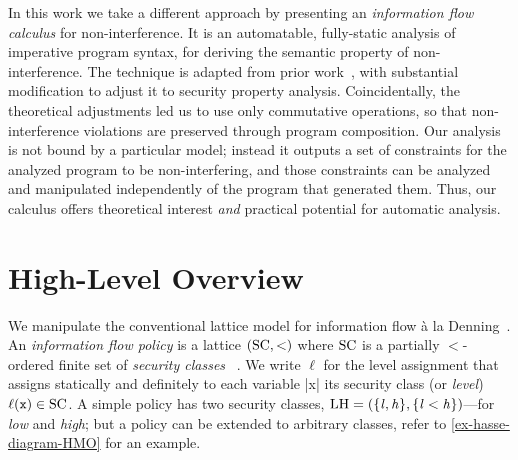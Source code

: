 In this work we take a different approach by presenting an \emph{information flow calculus} for non-interference.
It is an automatable, fully-static analysis of imperative program syntax, for deriving the semantic property of non-interference.
The technique is adapted from prior work~\cite{Aubert2023a}, with substantial modification to adjust it to security property analysis.
Coincidentally, the theoretical adjustments led us to use only commutative operations, so that non-interference violations are preserved through program composition.
Our analysis is not bound by a particular model;
instead it outputs a set of constraints for the analyzed program to be non-interfering, and
those constraints can be analyzed and manipulated independently of the program that generated them.
Thus, our calculus offers %
theoretical interest \emph{and} practical potential for automatic %
analysis.

\tocless\section{High-Level Overview}
\label{sec:overview}

We manipulate the conventional lattice model for information flow à la Denning~\cite{Denning76}.
An \emph{information flow policy} is a lattice \((\mathrm{SC}, <)\) where \(\mathrm{SC}\) is a partially \(<\)-ordered finite set of \emph{security classes}%
~\cite{VolpanoI1996}.
We write \(\ell\) for the level assignment that assigns statically and definitely to each variable \prc|x| its security class (or \emph{level}) \(\ell(\mathtt{x}) \in \mathrm{SC}\).
A simple policy has two security classes, \eg
\(\mathrm{LH}=(\{\mathit{l}, \mathit{h}\}, \{\mathit{l} < \mathit{h}\})\)---for \emph{low} and \emph{high};
but a policy can be extended to arbitrary classes, refer to \autoref{ex-hasse-diagram-HMO} for an example.

